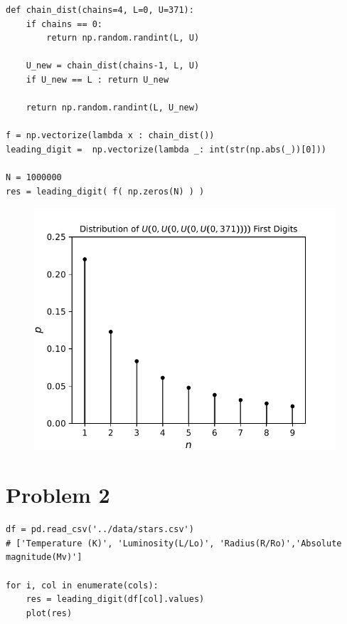 \documentclass{article}
\begin{document}
\begin{multicols}{2}
\begin{lstlisting}
def chain_dist(chains=4, L=0, U=371):
	if chains == 0:
		return np.random.randint(L, U) 
	
	U_new = chain_dist(chains-1, L, U)
	if U_new == L : return U_new
	
	return np.random.randint(L, U_new)
	
f = np.vectorize(lambda x : chain_dist())
leading_digit =  np.vectorize(lambda _: int(str(np.abs(_))[0]))

N = 1000000
res = leading_digit( f( np.zeros(N) ) )
\end{lstlisting}
	
	
\columnbreak

\begin{figure}[H]
	\centering
	\includegraphics[width=1\linewidth]{../drawings/p1}
\end{figure}


\end{multicols}


\section*{Problem 2}


	

\begin{lstlisting}
df = pd.read_csv('../data/stars.csv')
# ['Temperature (K)', 'Luminosity(L/Lo)', 'Radius(R/Ro)','Absolute magnitude(Mv)']

for i, col in enumerate(cols):
	res = leading_digit(df[col].values)
	plot(res)

\end{lstlisting}
	
\end{document}

